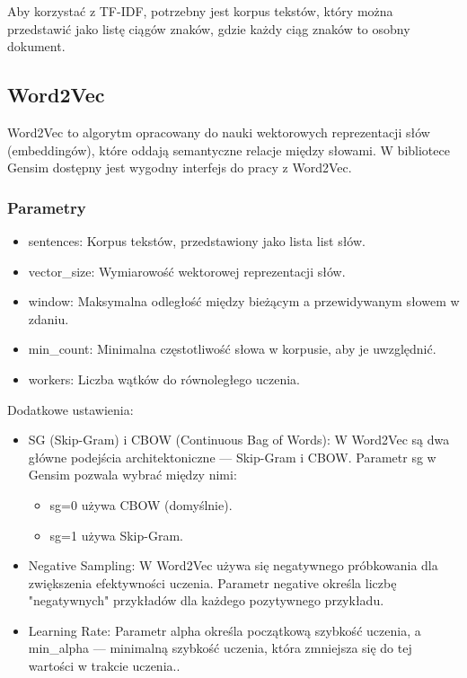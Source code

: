 			Aby korzystać z TF-IDF, potrzebny jest korpus tekstów, który można przedstawić jako listę ciągów znaków, gdzie każdy ciąg znaków to osobny dokument.
			
 
	\subsection{Word2Vec}
		Word2Vec to algorytm opracowany do nauki wektorowych reprezentacji słów (embeddingów), które oddają semantyczne relacje między słowami. W bibliotece Gensim dostępny jest wygodny interfejs do pracy z Word2Vec. \cite{word2vec}


		\subsubsection{Parametry}	
			\begin{itemize}
				\item sentences: Korpus tekstów, przedstawiony jako lista list słów.
				\item vector\_size: Wymiarowość wektorowej reprezentacji słów.
				\item window: Maksymalna odległość między bieżącym a przewidywanym słowem w zdaniu.
				\item min\_count: Minimalna częstotliwość słowa w korpusie, aby je uwzględnić.
				\item workers: Liczba wątków do równoległego uczenia.
			\end{itemize}
		
			Dodatkowe ustawienia:
			\begin{itemize}
				\item SG (Skip-Gram) i CBOW (Continuous Bag of Words): W Word2Vec są dwa główne podejścia architektoniczne — Skip-Gram i CBOW. Parametr sg w Gensim pozwala wybrać między nimi:
					\begin{itemize}
						\item sg=0 używa CBOW (domyślnie).
						\item sg=1 używa Skip-Gram.
					\end{itemize}
				\item Negative Sampling: W Word2Vec używa się negatywnego próbkowania dla zwiększenia efektywności uczenia. Parametr negative określa liczbę "negatywnych" przykładów dla każdego pozytywnego przykładu.
				\item Learning Rate: Parametr alpha określa początkową szybkość uczenia, a min\_alpha — minimalną szybkość uczenia, która zmniejsza się do tej wartości w trakcie uczenia..
			\end{itemize}
		
